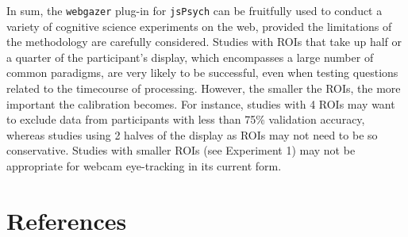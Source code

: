 \documentclass[
  man,floatsintext]{apa6}
\begin{document}
In sum, the \texttt{webgazer} plug-in for \texttt{jsPsych} can be fruitfully used to conduct a variety of cognitive science experiments on the web, provided the limitations of the methodology are carefully considered. Studies with ROIs that take up half or a quarter of the participant's display, which encompasses a large number of common paradigms, are very likely to be successful, even when testing questions related to the timecourse of processing. However, the smaller the ROIs, the more important the calibration becomes. For instance, studies with 4 ROIs may want to exclude data from participants with less than 75\% validation accuracy, whereas studies using 2 halves of the display as ROIs may not need to be so conservative. Studies with smaller ROIs (see Experiment 1) may not be appropriate for webcam eye-tracking in its current form.

\newpage

\hypertarget{references}{%
\section{References}\label{references}}

\begingroup
\setlength{\parindent}{-0.5in}
\setlength{\leftskip}{0.5in}
\end{document}
